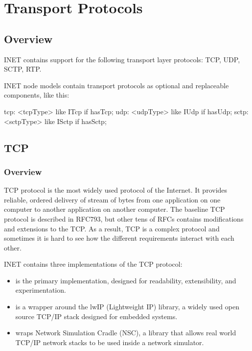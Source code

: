 \chapter{Transport Protocols}
\label{cha:transport-protocols}

\section{Overview}

INET contains support for the following transport layer protocols: TCP, UDP,
SCTP, RTP.

INET node models contain transport protocols as optional and replaceable
components, like this:

\begin{ned}
tcp: <tcpType> like ITcp if hasTcp;
udp: <udpType> like IUdp if hasUdp;
sctp: <sctpType> like ISctp if hasSctp;
\end{ned}

\section{TCP}
\label{sec:tcp}

\subsection{Overview}
\label{sec:tcp_prot}

TCP protocol is the most widely used protocol of the Internet. It provides
reliable, ordered delivery of stream of bytes from one application on one
computer to another application on another computer. The baseline TCP protocol
is described in RFC793, but other tens of RFCs contains modifications and
extensions to the TCP. As a result, TCP is a complex protocol and sometimes it
is hard to see how the different requirements interact with each other.

INET contains three implementations of the TCP protocol:

\begin{itemize}
  \item {} is the primary implementation, designed for readability, 
    extensibility, and experimentation.
  \item {} is a wrapper around the lwIP (Lightweight IP) library, 
    a widely used open source TCP/IP stack designed for embedded systems.
  \item {} wraps Network Simulation Cradle (NSC), a library 
    that allows real world TCP/IP network stacks to be used inside a 
    network simulator.
\end{itemize}

